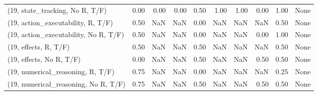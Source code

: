 \begin{table*}[h!]
\begin{adjustbox}{width=2\columnwidth,center}
\begin{tabular}{lrrr|rrr|rrr}
(19, state\_tracking, No R, T/F)       &                      0.00 &                  0.00 &                      0.00 &                          0.50 &                      1.00 &                          1.00 &                                   0.00 &                               1.00 &                                  None \\
(19, action\_executability, R, T/F)    &                      0.50 &                   NaN &                       NaN &                          0.00 &                       NaN &                           NaN &                                    NaN &                               0.50 &                                  None \\
(19, action\_executability, No R, T/F) &                      0.50 &                   NaN &                       NaN &                          0.00 &                       NaN &                           NaN &                                   0.00 &                               1.00 &                                  None \\
(19, effects, R, T/F)                 &                      0.50 &                   NaN &                       NaN &                          0.50 &                       NaN &                           NaN &                                    NaN &                               0.50 &                                  None \\
(19, effects, No R, T/F)              &                      0.00 &                   NaN &                       NaN &                          0.50 &                       NaN &                           NaN &                                   0.50 &                               0.50 &                                  None \\
(19, numerical\_reasoning, R, T/F)     &                      0.75 &                   NaN &                       NaN &                          0.00 &                       NaN &                           NaN &                                    NaN &                               0.25 &                                  None \\
(19, numerical\_reasoning, No R, T/F)  &                      0.75 &                   NaN &                       NaN &                          0.50 &                       NaN &                           NaN &                                   0.50 &                               0.50 &                                  None \\

\end{tabular}
\end{adjustbox}
\end{table*}
